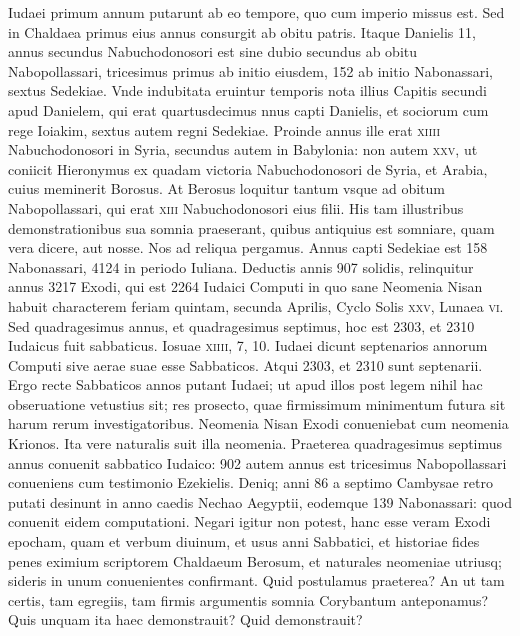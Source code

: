 Iudaei primum annum putarunt ab eo tempore, quo
cum imperio missus est. Sed in Chaldaea primus eius annus consurgit
ab obitu patris.
Itaque Danielis 11, annus secundus Nabuchodonosori
est sine dubio secundus ab obitu Nabopollassari, tricesimus
primus ab initio eiusdem, 152 ab initio Nabonassari, sextus
Sedekiae.
Vnde indubitata eruintur temporis nota illius Capitis secundi
apud Danielem, qui erat quartusdecimus nnus capti Danielis,
et sociorum cum rege Ioiakim, sextus autem regni Sedekiae.
Proinde annus ille erat \textsc{xiiii} Nabuchodonosori
 in Syria, secundus
autem in Babylonia: non autem \textsc{xxv}, ut coniicit Hieronymus
ex quadam victoria Nabuchodonosori de Syria, et Arabia, cuius
meminerit Borosus.
At Berosus loquitur tantum vsque ad obitum
Nabopollassari, qui erat \textsc{xiii} Nabuchodonosori eius filii.
His tam illustribus demonstrationibus sua somnia praeserant,
 quibus antiquius
est somniare, quam vera dicere, aut nosse.
Nos ad reliqua
pergamus.
Annus capti Sedekiae est 158 Nabonassari, 4124 in periodo Iuliana.
Deductis annis 907 solidis, relinquitur annus 3217
Exodi, qui est 2264 Iudaici Computi in quo sane Neomenia Nisan
habuit characterem feriam quintam, secunda Aprilis, Cyclo
Solis \textsc{xxv}, Lunaea \textsc{vi}.
Sed quadragesimus annus, et quadragesimus
septimus, hoc est 2303, et 2310 Iudaicus fuit sabbaticus.
Iosuae
\textsc{xiiii}, 7, 10.
Iudaei dicunt septenarios annorum Computi sive aerae
suae esse Sabbaticos.
Atqui 2303, et 2310 sunt septenarii.
Ergo recte
Sabbaticos annos putant Iudaei; ut apud illos post legem nihil
hac obseruatione vetustius sit; res prosecto, quae firmissimum
minimentum futura sit harum rerum investigatoribus.
Neomenia Nisan Exodi conueniebat cum neomenia Krionos.
Ita vere naturalis suit illa neomenia.
Praeterea quadragesimus septimus
annus conuenit sabbatico Iudaico: 902 autem annus est tricesimus
Nabopollassari conueniens cum testimonio Ezekielis.
Deniq; anni 86 a septimo Cambysae retro putati desinunt in anno
caedis Nechao Aegyptii, eodemque 139 Nabonassari: quod conuenit
eidem computationi.
Negari igitur non potest, hanc esse veram
Exodi epocham, quam et verbum diuinum, et usus anni Sabbatici,
et historiae fides penes eximium scriptorem Chaldaeum
Berosum, et naturales neomeniae utriusq; sideris in unum conuenientes
confirmant.
Quid postulamus praeterea?
An ut tam certis,
tam egregiis, tam firmis argumentis somnia Corybantum anteponamus?
Quis unquam ita haec demonstrauit?
Quid demonstrauit?

